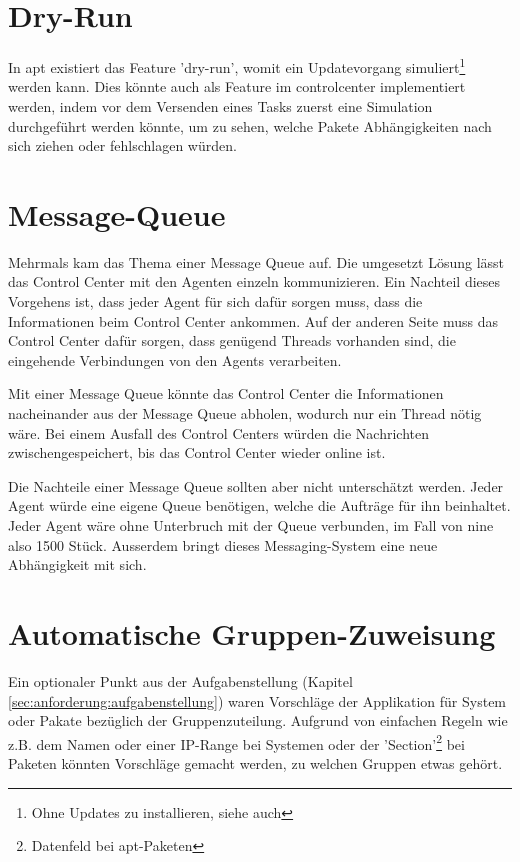 \section{Dry-Run}

In \gls{apt} existiert das Feature 'dry-run', womit ein Updatevorgang simuliert\footnote{Ohne Updates zu installieren, siehe auch } werden kann. Dies könnte auch als Feature im \gls{controlcenter} implementiert werden, indem vor dem Versenden eines Tasks zuerst eine Simulation durchgeführt werden könnte, um zu sehen, welche Pakete Abhängigkeiten nach sich ziehen oder fehlschlagen würden.

\section{Message-Queue} \label{sec:ausblick:message_queue}

Mehrmals kam das Thema einer Message Queue auf. Die umgesetzt Lösung lässt das Control Center mit den Agenten einzeln kommunizieren. Ein Nachteil dieses Vorgehens ist, dass jeder Agent für sich dafür sorgen muss, dass die Informationen beim Control Center ankommen. Auf der anderen Seite muss das Control Center dafür sorgen, dass genügend Threads vorhanden sind, die eingehende Verbindungen von den Agents verarbeiten.

Mit einer Message Queue könnte das Control Center die Informationen nacheinander aus der Message Queue abholen, wodurch nur ein Thread nötig wäre. Bei einem Ausfall des Control Centers würden die Nachrichten zwischengespeichert, bis das Control Center wieder online ist.

Die Nachteile einer Message Queue sollten aber nicht unterschätzt werden. Jeder Agent würde eine eigene Queue benötigen, welche die Aufträge für ihn beinhaltet. Jeder Agent wäre ohne Unterbruch mit der Queue verbunden, im Fall von \gls{nine} also 1500 Stück. Ausserdem bringt dieses Messaging-System eine neue Abhängigkeit mit sich. 

\section{Automatische Gruppen-Zuweisung} \label{sec:ausblick:auto_group_assignment}

Ein optionaler Punkt aus der Aufgabenstellung (Kapitel \ref{sec:anforderung:aufgabenstellung}) waren Vorschläge der Applikation für System oder Pakate bezüglich der Gruppenzuteilung. Aufgrund von einfachen Regeln wie z.B. dem Namen oder einer IP-Range bei Systemen oder der 'Section'\footnote{Datenfeld bei apt-Paketen} bei Paketen könnten Vorschläge gemacht werden, zu welchen Gruppen etwas gehört.


